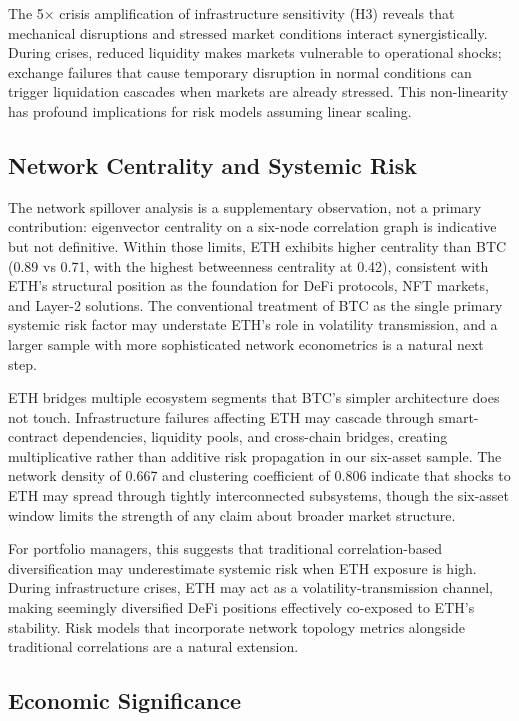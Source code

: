 \documentclass[pdflatex,sn-mathphys-num]{sn-jnl}
\theoremstyle{thmstyleone}
\theoremstyle{thmstyletwo}
\theoremstyle{thmstylethree}
\begin{document}
The 5$\times$ crisis amplification of infrastructure sensitivity (H3) reveals that mechanical disruptions and stressed market conditions interact synergistically. During crises, reduced liquidity makes markets vulnerable to operational shocks; exchange failures that cause temporary disruption in normal conditions can trigger liquidation cascades when markets are already stressed. This non-linearity has profound implications for risk models assuming linear scaling.

\subsection{Network Centrality and Systemic Risk}

The network spillover analysis is a supplementary observation, not a primary contribution: eigenvector centrality on a six-node correlation graph is indicative but not definitive. Within those limits, ETH exhibits higher centrality than BTC (0.89 vs 0.71, with the highest betweenness centrality at 0.42), consistent with ETH's structural position as the foundation for DeFi protocols, NFT markets, and Layer-2 solutions. The conventional treatment of BTC as the single primary systemic risk factor may understate ETH's role in volatility transmission, and a larger sample with more sophisticated network econometrics is a natural next step.

ETH bridges multiple ecosystem segments that BTC's simpler architecture does not touch. Infrastructure failures affecting ETH may cascade through smart-contract dependencies, liquidity pools, and cross-chain bridges, creating multiplicative rather than additive risk propagation in our six-asset sample. The network density of 0.667 and clustering coefficient of 0.806 indicate that shocks to ETH may spread through tightly interconnected subsystems, though the six-asset window limits the strength of any claim about broader market structure.

For portfolio managers, this suggests that traditional correlation-based diversification may underestimate systemic risk when ETH exposure is high. During infrastructure crises, ETH may act as a volatility-transmission channel, making seemingly diversified DeFi positions effectively co-exposed to ETH's stability. Risk models that incorporate network topology metrics alongside traditional correlations are a natural extension.

\subsection{Economic Significance}
\end{document}
